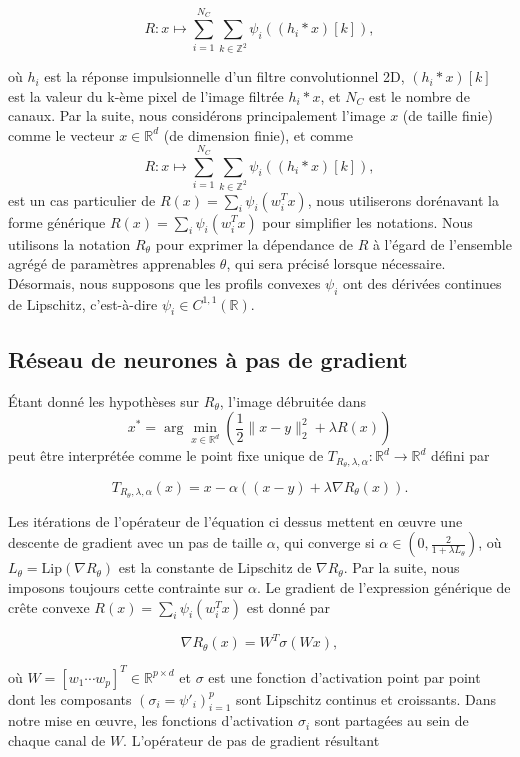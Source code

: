 \documentclass[a4paper, 12pt]{report} %
\begin{document}
\[
R: x \mapsto \sum_{i=1}^{N_C} \sum_{k \in \mathbb{Z}^2} \psi_i \left( (h_i * x)[k] \right),
\]

où \( h_i \) est la réponse impulsionnelle d'un filtre convolutionnel 2D, \( (h_i * x)[k] \) est la valeur du k-ème pixel de l'image filtrée \( h_i * x \), et \( N_C \) est le nombre de canaux. Par la suite, nous considérons principalement l'image \( x \) (de taille finie) comme le vecteur \( x \in \mathbb{R}^d \) (de dimension finie), et comme \[
R: x \mapsto \sum_{i=1}^{N_C} \sum_{k \in \mathbb{Z}^2} \psi_i \left( (h_i * x)[k] \right),
\] est un cas particulier de $R(x) = \sum_{i} \psi_i(w_i^T x)$, nous utiliserons dorénavant la forme générique $R(x) = \sum_{i} \psi_i(w_i^T x)$ pour simplifier les notations. Nous utilisons la notation \( R_\theta \) pour exprimer la dépendance de \( R \) à l'égard de l'ensemble agrégé de paramètres apprenables \( \theta \), qui sera précisé lorsque nécessaire. Désormais, nous supposons que les profils convexes \( \psi_i \) ont des dérivées continues de Lipschitz, c'est-à-dire \( \psi_i \in C^{1,1}(\mathbb{R}) \).
\subsection{Réseau de neurones à pas de gradient}
Étant donné les hypothèses sur \( R_\theta \), l'image débruitée dans \[
x^* = \arg \min_{x \in \mathbb{R}^d} \left( \frac{1}{2} \| x - y \|_2^2 + \lambda R(x) \right)
\] peut être interprétée comme le point fixe unique de \( T_{R_\theta,\lambda,\alpha} : \mathbb{R}^d \to \mathbb{R}^d \) défini par

\[
T_{R_\theta,\lambda,\alpha}(x) = x - \alpha \left( (x - y) + \lambda \nabla R_\theta(x) \right).
\]

Les itérations de l'opérateur de l'équation ci dessus mettent en œuvre une descente de gradient avec un pas de taille \( \alpha \), qui converge si \( \alpha \in \left(0, \frac{2}{1 + \lambda L_\theta}\right) \), où \( L_\theta = \text{Lip}(\nabla R_\theta) \) est la constante de Lipschitz de \( \nabla R_\theta \). Par la suite, nous imposons toujours cette contrainte sur \( \alpha \). Le gradient de l'expression générique de crête convexe $R(x) = \sum_{i} \psi_i(w_i^T x)$ est donné par

\[
\nabla R_\theta(x) = W^T \sigma(Wx),
\]

où \( W = [w_1 \cdots w_p]^T \in \mathbb{R}^{p \times d} \) et \( \sigma \) est une fonction d'activation point par point dont les composants \( (\sigma_i = \psi'_i)_{i=1}^p \) sont Lipschitz continus et croissants. Dans notre mise en œuvre, les fonctions d'activation \( \sigma_i \) sont partagées au sein de chaque canal de \( W \). L'opérateur de pas de gradient résultant
\end{document}
